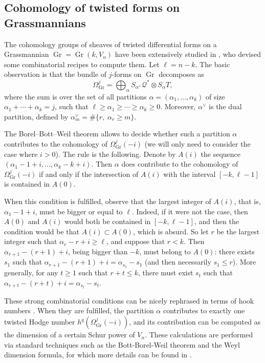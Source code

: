 \documentclass[JEP,XML,SOM,Unicode,NoEqCountersInSection]{cedram}
\let\mathcal\mathscr
\theoremstyle{plain}
\theoremstyle{definition}
\DeclareMathOperator{\Gr}{Gr}
\newcommand{\sheaf}[1]{\mathcal{#1}}
\newcommand{\kq}{\sheaf{Q}}
\begin{document}
\subsection{Cohomology of twisted forms on Grassmannians} \label{twisted}
The cohomology groups of sheaves of twisted differential forms on a Grassmannian
$\Gr=\Gr(k,V_n)$ have been extensively studied in \cite{snow}, who devised some combinatorial recipes to compute them. Let $\ell=n-k$.
The basic observation is that the bundle of $j$-forms on $\Gr$
decomposes as
\[
\Omega^j_{\Gr} = \bigoplus_\alpha S_{\alpha^\vee}\kq^*\otimes S_\alpha T,
\]
where the sum is over the set of all partitions $\alpha=(\alpha_1,\ldots, \alpha_k)$
of size $\alpha_1+\cdots +\alpha_k=j$, such that $\ell\ge \alpha_1\ge \cdots\ge \alpha_k\ge 0$.
Moreover, $\alpha^\vee$ is the dual partition, defined by $\alpha^\vee_m=\#\{r, \; \alpha_r\ge m\}$.

The Borel--Bott--Weil theorem allows to decide whether such a partition $\alpha$ contributes to
the cohomology of $\Omega^j_{\Gr}(-i)$ (we will only need to consider the case where
$i>0$). The rule is the following.
Denote by $A(i)$ the sequence $(\alpha_1-1+i,\ldots ,\alpha_k-k+i)$.
Then $\alpha$ does contribute to the cohomology of $\Omega_{\Gr}^j(-i)$ if and only if
the intersection of $A(i)$ with the interval $[-k,\ell-1]$ is contained in $A(0)$.

When this condition is fulfilled, observe that the largest integer
of $A(i)$, that is, $\alpha_1-1+i$, must be bigger or equal to $\ell$. Indeed, if it
were not the case, then $A(0)$ and $A(i)$ would both be contained in $[-k,\ell-1]$,
and then the condition would be that $A(i)\subset A(0)$, which is absurd. So let $r$ be the
largest integer such that $\alpha_r-r+i\ge \ell$, and suppose that $r<k$. Then $\alpha_{r+1}-(r+1)+i$, being bigger than $-k$, must belong to $A(0)$:
there exists $s_1$ such that $\alpha_{r+1}-(r+1)+i=\alpha_{s_1}-s_1$ (and then necessarily
$s_1\le r$). More generally, for any $t\ge 1$ such that $r+t\le k$, there must exist $s_t$ such that $\alpha_{r+t}-(r+t)+i=\alpha_{s_t}-s_t$.

These strong combinatorial conditions can be nicely rephrased in terms
of hook numbers \cite{snow}. When they are fulfilled, the partition $\alpha$ contributes
to exactly one twisted Hodge number $h^q(\Omega^j_{\Gr}(-i))$, and its contribution can
be computed as the dimension of a certain Schur power of $V_n$.
These calculations are performed via standard techniques such as the Bott-Borel-Weil theorem
and the Weyl dimension formula, for which more details can be found in \cite{weyman-book}.
\end{document}
